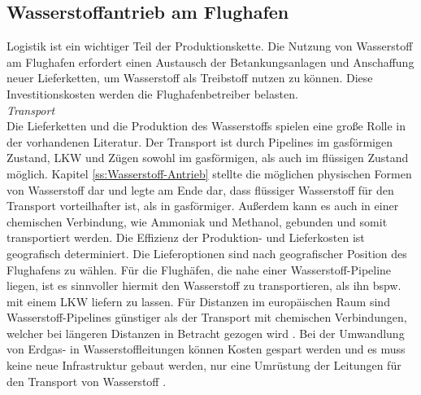 
\subsection{Wasserstoffantrieb am Flughafen}
Logistik ist ein wichtiger Teil der Produktionskette. 
Die Nutzung von Wasserstoff am Flughafen erfordert einen Austausch der 
Betankungsanlagen und Anschaffung neuer Lieferketten, 
um Wasserstoff als Treibstoff nutzen zu können. 
Diese Investitionskosten werden die Flughafenbetreiber belasten.\\ %
\textit{Transport}\\
Die Lieferketten und die Produktion des Wasserstoffs spielen 
eine große Rolle in der vorhandenen Literatur.
Der Transport ist durch Pipelines im gasförmigen Zustand, 
LKW und Zügen sowohl im gasförmigen, als auch im flüssigen Zustand möglich. 
Kapitel \ref{ss:Wasserstoff-Antrieb} stellte die möglichen physischen Formen 
von Wasserstoff dar und legte am Ende dar, dass flüssiger Wasserstoff für 
den Transport vorteilhafter ist, als in gasförmiger. 
Außerdem kann es auch in einer chemischen Verbindung, 
wie Ammoniak und Methanol, gebunden und somit transportiert werden.
%
%
%
% 
Die Effizienz der Produktion- und Lieferkosten ist geografisch determiniert. 
Die Lieferoptionen sind nach geografischer Position des Flughafens zu wählen. 
Für die Flughäfen, die nahe einer Wasserstoff-Pipeline liegen, ist es sinnvoller
hiermit den Wasserstoff zu transportieren, als ihn bspw. mit einem LKW liefern zu lassen.
%
Für Distanzen im europäischen Raum sind Wasserstoff-Pipelines
günstiger als der Transport mit chemischen Verbindungen, 
welcher bei längeren Distanzen in Betracht gezogen wird \cite{undertaking2022strategic}. 
Bei der Umwandlung von Erdgas- in Wasserstoffleitungen können Kosten gespart
werden und es muss keine neue Infrastruktur gebaut werden, 
nur eine Umrüstung der Leitungen für den Transport von Wasserstoff \cite{undertaking2022strategic}.

